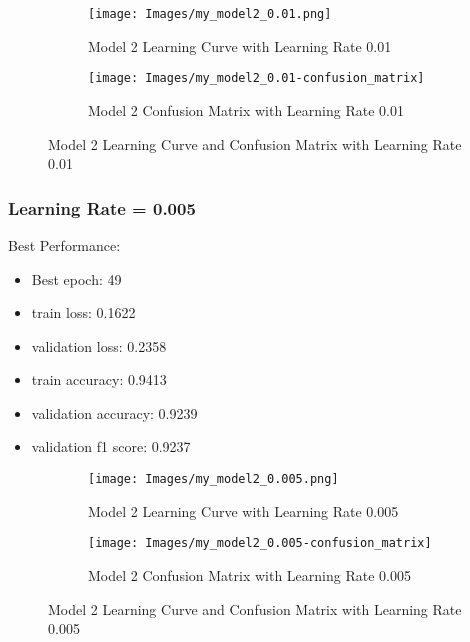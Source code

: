 \documentclass{article}
\begin{document}
\begin{figure}[h]
    \begin{subfigure}{0.5\textwidth}
        \texttt{[image: Images/my\_model2\_0.01.png]} 
        \caption{Model 2 Learning Curve with Learning Rate 0.01}
        \label{fig:model2_lr_0.01}
    \end{subfigure}
    \begin{subfigure}{0.5\textwidth}
        \texttt{[image: Images/my\_model2\_0.01-confusion\_matrix]} 
        \caption{Model 2 Confusion Matrix with Learning Rate 0.01}
        \label{fig:model2_lr_0.01_confusion_matrix}
    \end{subfigure}
    \caption{Model 2 Learning Curve and Confusion Matrix with Learning Rate 0.01}
    \label{fig:model2_lr_0.01_combined}
\end{figure}

\subsubsection{Learning Rate = 0.005}
Best Performance:
\begin{itemize}
    \item Best epoch: 49
    \item train loss: 0.1622
    \item validation loss: 0.2358
    \item train accuracy: 0.9413
    \item validation accuracy: 0.9239
    \item validation f1 score: 0.9237
\end{itemize}

\begin{figure}[h]
    \begin{subfigure}{0.5\textwidth}
        \texttt{[image: Images/my\_model2\_0.005.png]} 
        \caption{Model 2 Learning Curve with Learning Rate 0.005}
        \label{fig:model2_lr_0.005}
    \end{subfigure}
    \begin{subfigure}{0.5\textwidth}
        \texttt{[image: Images/my\_model2\_0.005-confusion\_matrix]} 
        \caption{Model 2 Confusion Matrix with Learning Rate 0.005}
        \label{fig:model2_lr_0.005_confusion_matrix}
    \end{subfigure}
    \caption{Model 2 Learning Curve and Confusion Matrix with Learning Rate 0.005}
    \label{fig:model2_lr_0.005_combined}
\end{figure}
\end{document}
